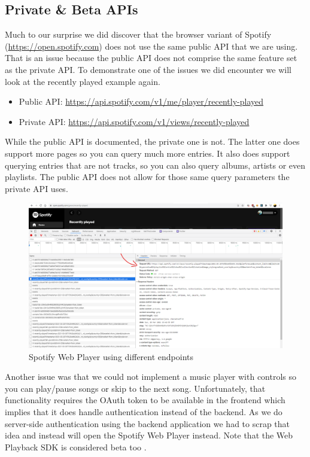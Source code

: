 \subsection{Private \& Beta APIs}

Much to our surprise we did discover that the browser variant of Spotify (\url{https://open.spotify.com}) does not use the same public API that we are using. That is an issue because the public API does not comprise the same feature set as the private API. To demonstrate one of the issues we did encounter we will look at the recently played example again.

\begin{itemize}
    \item Public API: \url{https://api.spotify.com/v1/me/player/recently-played}
    \item Private API: \url{https://api.spotify.com/v1/views/recently-played}
\end{itemize}

While the public API is documented, the private one is not. The latter one does support more pages so you can query much more entries. It also does support querying entries that are not tracks, so you can also query albums, artists or even playlists. The public API does not allow for those same query parameters the private API uses.

\begin{figure}[bth]
    \centering
    \includegraphics[width=1.0\textwidth]{Graphics/Chapter4/open-spotify-api.png}
    \caption{Spotify Web Player using different endpoints}
\end{figure}

Another issue was that we could not implement a music player with controls so you can play/pause songs or skip to the next song. Unfortunately, that functionality requires the OAuth token to be available in the frontend which implies that it does handle authentication instead of the backend. As we do server-side authentication using the backend application we had to scrap that idea and instead will open the Spotify Web Player instead. Note that the Web Playback SDK is considered beta too \cite{SpotifyWebPlaybackSdk}.

